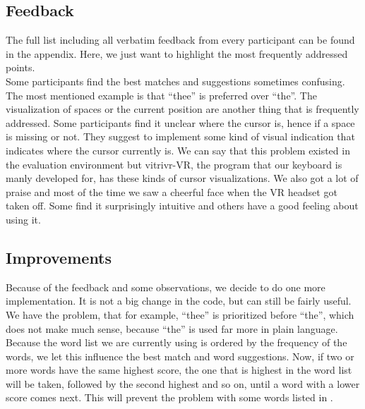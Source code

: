 
\subsection{Feedback}
The full list including all verbatim feedback from every participant can be found in the appendix. Here, we just want to highlight the most frequently addressed points.\\
Some participants find the best matches and suggestions sometimes confusing. The most mentioned example is that ``thee'' is preferred over ``the''. The visualization of spaces or the current position are another thing that is frequently addressed. Some participants find it unclear where the cursor is, hence if a space is missing or not. They suggest to implement some kind of visual indication that indicates where the cursor currently is. We can say that this problem existed in the evaluation environment but vitrivr-VR, the program that our keyboard is manly developed for, has these kinds of cursor visualizations. We also got a lot of praise and most of the time we saw a cheerful face when the VR headset got taken off. Some find it surprisingly intuitive and others have a good feeling about using it.

\subsection{Improvements}
Because of the feedback and some observations, we decide to do one more implementation. It is not a big change in the code, but can still be fairly useful. We have the problem, that for example, ``thee'' is prioritized before ``the'', which does not make much sense, because ``the'' is used far more in plain language. Because the word list we are currently using is ordered by the frequency of the words, we let this influence the best match and word suggestions. Now, if two or more words have the same highest score, the one that is highest in the word list will be taken, followed by the second highest and so on, until a word with a lower score comes next. This will prevent the problem with some words listed in .